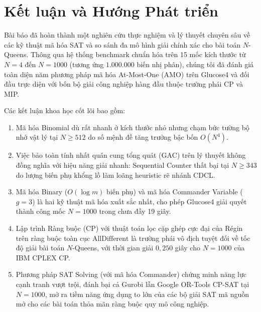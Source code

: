 \documentclass[a4paper,fleqn]{cas-sc}
\begin{document}
\section{Kết luận và Hướng Phát triển}
\label{sec:conclusion}

Bài báo đã hoàn thành một nghiên cứu thực nghiệm và lý thuyết chuyên sâu về các kỹ thuật mã hóa SAT và so sánh đa mô hình giải chính xác cho bài toán $N$-Queens. Thông qua hệ thống benchmark chuẩn hóa trên 15 mốc kích thước từ $N = 4$ đến $N = 1000$ (tương ứng $1.000.000$ biến nhị phân), chúng tôi đã đánh giá toàn diện năm phương pháp mã hóa At-Most-One (AMO) trên Glucose4 và đối đầu trực diện với bốn bộ giải công nghiệp hàng đầu thuộc trường phái CP và MIP.

Các kết luận khoa học cốt lõi bao gồm:
\begin{enumerate}
    \item Mã hóa Binomial dù rất nhanh ở kích thước nhỏ nhưng chạm bức tường bộ nhớ vật lý tại $N \ge 512$ do số mệnh đề tăng trưởng bậc bốn $O(N^4)$.
    \item Việc bảo toàn tính nhất quán cung tổng quát (GAC) trên lý thuyết không đồng nghĩa với hiệu năng giải nhanh: Sequential Counter thất bại tại $N \ge 343$ do lượng biến phụ khổng lồ làm loãng heuristic rẽ nhánh CDCL.
    \item Mã hóa Binary ($O(\log m)$ biến phụ) và mã hóa Commander Variable ($g=3$) là hai kỹ thuật mã hóa xuất sắc nhất, cho phép Glucose4 giải quyết thành công mốc $N = 1000$ trong chưa đầy 19 giây.
    \item Lập trình Ràng buộc (CP) với thuật toán lọc cặp ghép cực đại của Régin trên ràng buộc toàn cục $\text{AllDifferent}$ là trường phái vô địch tuyệt đối về tốc độ giải bài toán $N$-Queens, với thời gian giải $0{,}250$ giây cho $N = 1000$ của IBM CPLEX CP.
    \item Phương pháp SAT Solving (với mã hóa Commander) chứng minh năng lực cạnh tranh vượt trội, đánh bại cả Gurobi lẫn Google OR-Tools CP-SAT tại $N = 1000$, mở ra tiềm năng ứng dụng to lớn của các bộ giải SAT mã nguồn mở cho các bài toán thỏa mãn ràng buộc quy mô công nghiệp.
\end{enumerate}
\end{document}
